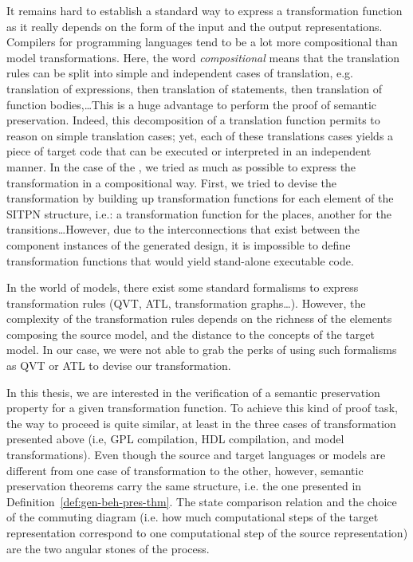 \documentclass[pdflatex,sn-mathphys]{sn-jnl}%
\theoremstyle{thmstyleone}%
\theoremstyle{thmstyletwo}%
\theoremstyle{thmstylethree}%
\begin{document}
It remains hard to establish a standard way to express a
transformation function as it really depends on the form of the input
and the output representations. Compilers for programming languages
tend to be a lot more compositional than model transformations. Here,
the word \textit{compositional} means that the translation rules can
be split into simple and independent cases of translation, e.g.
translation of expressions, then translation of statements, then
translation of function bodies,\dots This is a huge advantage to
perform the proof of semantic preservation. Indeed, this decomposition
of a translation function permits to reason on simple translation
cases; yet, each of these translations cases yields a piece of target
code that can be executed or interpreted in an independent manner. In
the case of the \hilecop{}, we tried as much as possible to express
the transformation in a compositional way. First, we tried to devise
the transformation by building up transformation functions for each
element of the SITPN structure, i.e.: a transformation function for
the places, another for the transitions\dots However, due to the
interconnections that exist between the component instances of the
generated \hvhdl{} design, it is impossible to define transformation
functions that would yield stand-alone executable code.

In the world of models, there exist some standard formalisms to
express transformation rules (QVT, ATL, transformation graphs\dots).
However, the complexity of the transformation rules depends on the
richness of the elements composing the source model, and the distance
to the concepts of the target model. In our case, we were not able to
grab the perks of using such formalisms as QVT or ATL to devise our
transformation.

In this thesis, we are interested in the verification of a semantic
preservation property for a given transformation function. To achieve
this kind of proof task, the way to proceed is quite similar, at least
in the three cases of transformation presented above (i.e, GPL
compilation, HDL compilation, and model transformations). Even though
the source and target languages or models are different from one case
of transformation to the other, however, semantic preservation
theorems carry the same structure, i.e. the one presented in
Definition~\ref{def:gen-beh-pres-thm}. The state comparison relation
and the choice of the commuting diagram (i.e. how much computational
steps of the target representation correspond to one computational
step of the source representation) are the two angular stones of the
process.
\end{document}
